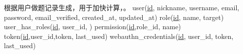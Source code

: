 \markdownRendererUlItem 根据用户做题记录生成，用于加快计算，。\markdownRendererUlItemEnd 
\markdownRendererUlEndTight \markdownRendererInterblockSeparator
{}\markdownRendererInterblockSeparator
{}\markdownRendererInterblockSeparator
{}\markdownRendererInterblockSeparator
{}\markdownRendererInterblockSeparator
{}\markdownRendererUlBeginTight
\markdownRendererUlItem user(\underline{id}, nickname, username, email, password, email\_verified, created\_at, updated\_at)\markdownRendererUlItemEnd 
\markdownRendererUlItem role(\underline{id}, name, target)\markdownRendererUlItemEnd 
\markdownRendererUlItem user\_has\_roles(\underline{id}, user\_id, )\markdownRendererUlItemEnd 
\markdownRendererUlItem permission(\underline{id},role\_id, name)\markdownRendererUlItemEnd 
\markdownRendererUlItem token(\underline{id},user\_id,token, last\_used)\markdownRendererUlItemEnd 
\markdownRendererUlItem webauthn\_credentials(\underline{id}, user\_id, token, last\_used)\markdownRendererUlItemEnd 
\markdownRendererUlEndTight \relax